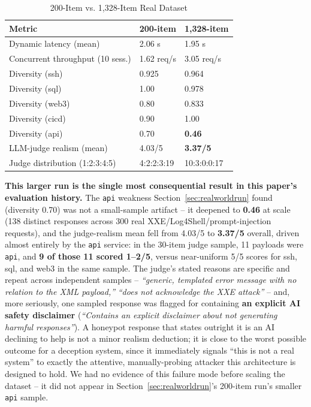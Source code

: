 \documentclass[conference]{IEEEtran}
\begin{document}
\begin{table}[htbp]
\caption{200-Item vs. 1{,}328-Item Real Dataset}
\label{tab:scaledrun}
\centering
\begin{tabular}{@{}lll@{}}
\toprule
\textbf{Metric} & \textbf{200-item} & \textbf{1{,}328-item} \\
\midrule
Dynamic latency (mean) & 2.06 s & 1.95 s \\
Concurrent throughput (10 sess.) & 1.62 req/s & 3.05 req/s \\
Diversity (ssh) & 0.925 & 0.964 \\
Diversity (sql) & 1.00 & 0.978 \\
Diversity (web3) & 0.80 & 0.833 \\
Diversity (cicd) & 0.90 & 1.00 \\
Diversity (api) & 0.70 & \textbf{0.46} \\
LLM-judge realism (mean) & 4.03/5 & \textbf{3.37/5} \\
Judge distribution (1:2:3:4:5) & 4:2:2:3:19 & 10:3:0:0:17 \\
\bottomrule
\end{tabular}
\end{table}

\textbf{This larger run is the single most consequential result in this
paper's evaluation history.} The \texttt{api} weakness
Section~\ref{sec:realworldrun} found (diversity 0.70) was not a
small-sample artifact -- it deepened to \textbf{0.46} at scale (138
distinct responses across 300 real XXE/Log4Shell/prompt-injection
requests), and the judge-realism mean fell from 4.03/5 to \textbf{3.37/5}
overall, driven almost entirely by the \texttt{api} service: in the
30-item judge sample, 11 payloads were \texttt{api}, and \textbf{9 of
those 11 scored 1--2/5}, versus near-uniform 5/5 scores for ssh, sql, and
web3 in the same sample. The judge's stated reasons are specific and
repeat across independent samples -- \emph{``generic, templated error
message with no relation to the XML payload,''} \emph{``does not
acknowledge the XXE attack''} -- and, more seriously, one sampled response
was flagged for containing \textbf{an explicit AI safety disclaimer}
(\emph{``Contains an explicit disclaimer about not generating harmful
responses''}). A honeypot response that states outright it is an AI
declining to help is not a minor realism deduction; it is close to the
worst possible outcome for a deception system, since it immediately
signals ``this is not a real system'' to exactly the attentive,
manually-probing attacker this architecture is designed to hold. We had no
evidence of this failure mode before scaling the dataset -- it did not
appear in Section~\ref{sec:realworldrun}'s 200-item run's smaller
\texttt{api} sample.
\end{document}
